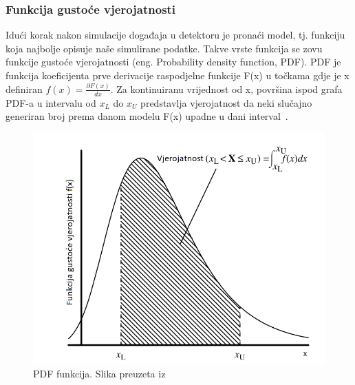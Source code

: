 \documentclass[12pt,a4paper,oneside]{article}
\begin{document}
\begin{linenumbers}
		\subsubsection{Funkcija gustoće vjerojatnosti}
		Idući korak nakon simulacije događaja u detektoru je pronaći model, tj. funkciju koja najbolje opisuje naše simulirane podatke. Takve vrste funkcija se zovu funkcije gustoće vjerojatnosti (eng. Probability density function, PDF). PDF je funkcija koeficijenta prve derivacije raspodjelne funkcije F(x) u točkama gdje je x definiran \begin{math}
		f(x)=\frac{\partial F(x)}{dx}
		\end{math}. Za kontinuiranu vrijednost od x, površina ispod grafa PDF-a u intervalu od $x_L$ do $x_U$ predstavlja vjerojatnost da neki slučajno generiran broj prema danom modelu F(x) upadne u dani interval~\cite{pdf}.
		\begin{figure}[H]
			\centering
			\includegraphics[width=1.0\textwidth]{sl4.png}
			\caption[Saturn viđen u ultraljubičastom svjetlu.]{\label{sl:pdf}PDF funkcija. Slika preuzeta iz ~\cite{pdf}}
		\end{figure}
	

\end{linenumbers}
\end{document}
